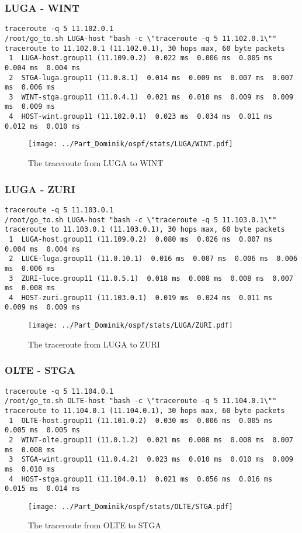\subsubsection{LUGA - WINT}
\begin{lstlisting}
traceroute -q 5 11.102.0.1
/root/go_to.sh LUGA-host "bash -c \"traceroute -q 5 11.102.0.1\""
traceroute to 11.102.0.1 (11.102.0.1), 30 hops max, 60 byte packets
 1  LUGA-host.group11 (11.109.0.2)  0.022 ms  0.006 ms  0.005 ms  0.004 ms  0.004 ms
 2  STGA-luga.group11 (11.0.8.1)  0.014 ms  0.009 ms  0.007 ms  0.007 ms  0.006 ms
 3  WINT-stga.group11 (11.0.4.1)  0.021 ms  0.010 ms  0.009 ms  0.009 ms  0.009 ms
 4  HOST-wint.group11 (11.102.0.1)  0.023 ms  0.034 ms  0.011 ms  0.012 ms  0.010 ms
\end{lstlisting}
\begin{figure}[H]
\centering
\texttt{[image: ../Part\_Dominik/ospf/stats/LUGA/WINT.pdf]}
\caption{The traceroute from LUGA to WINT}
\end{figure}
\clearpage
\subsubsection{LUGA - ZURI}
\begin{lstlisting}
traceroute -q 5 11.103.0.1
/root/go_to.sh LUGA-host "bash -c \"traceroute -q 5 11.103.0.1\""
traceroute to 11.103.0.1 (11.103.0.1), 30 hops max, 60 byte packets
 1  LUGA-host.group11 (11.109.0.2)  0.080 ms  0.026 ms  0.007 ms  0.004 ms  0.004 ms
 2  LUCE-luga.group11 (11.0.10.1)  0.016 ms  0.007 ms  0.006 ms  0.006 ms  0.006 ms
 3  ZURI-luce.group11 (11.0.5.1)  0.018 ms  0.008 ms  0.008 ms  0.007 ms  0.008 ms
 4  HOST-zuri.group11 (11.103.0.1)  0.019 ms  0.024 ms  0.011 ms  0.009 ms  0.009 ms
\end{lstlisting}
\begin{figure}[H]
\centering
\texttt{[image: ../Part\_Dominik/ospf/stats/LUGA/ZURI.pdf]}
\caption{The traceroute from LUGA to ZURI}
\end{figure}
\clearpage
\subsubsection{OLTE - STGA}
\begin{lstlisting}
traceroute -q 5 11.104.0.1
/root/go_to.sh OLTE-host "bash -c \"traceroute -q 5 11.104.0.1\""
traceroute to 11.104.0.1 (11.104.0.1), 30 hops max, 60 byte packets
 1  OLTE-host.group11 (11.101.0.2)  0.030 ms  0.006 ms  0.005 ms  0.005 ms  0.005 ms
 2  WINT-olte.group11 (11.0.1.2)  0.021 ms  0.008 ms  0.008 ms  0.007 ms  0.008 ms
 3  STGA-wint.group11 (11.0.4.2)  0.023 ms  0.010 ms  0.010 ms  0.009 ms  0.010 ms
 4  HOST-stga.group11 (11.104.0.1)  0.021 ms  0.056 ms  0.016 ms  0.015 ms  0.014 ms
\end{lstlisting}
\begin{figure}[H]
\centering
\texttt{[image: ../Part\_Dominik/ospf/stats/OLTE/STGA.pdf]}
\caption{The traceroute from OLTE to STGA}
\end{figure}
\clearpage
